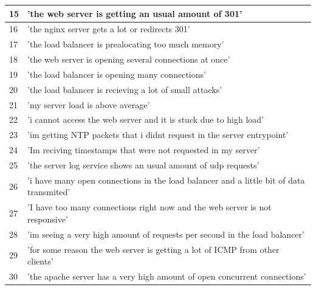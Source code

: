 \begin{table}
{\begin{tabular}{|l|l|}
\hline
15     & 'the web server is getting an usual amount of 301'                                                        \\ 
\hline
16     & 'the nginx server gets a lot or redirects 301'                                                            \\ 
\hline
17     & 'the load balancer is prealocating too much memory'                                                       \\ 
\hline
18     & 'the web server is opening several connections at once'                                                   \\ 
\hline
19     & 'the load balancer is opening many connections'                                                           \\ 
\hline
20     & 'the load balancer is recieving a lot of small attacks'                                                   \\ 
\hline
21     & 'my server load is above average'                                                                         \\ 
\hline
22     & 'i cannot access the web server and it is stuck due to high load'                                         \\ 
\hline
23     & 'im getting NTP packets that i didnt request in the server entrypoint'                                    \\ 
\hline
24     & 'Im reciving timestamps that were not requested in my server'                                             \\ 
\hline
25     & 'the server log service shows an usual amount of udp requests'                                            \\ 
\hline
26     & 'i have many open connections in the load balancer and a little bit of data transmited'                   \\ 
\hline
27     & 'I have too many connections right now and the web server is not responsive'                              \\ 
\hline
28     & 'im seeing a very high amount of requests per second in the load balancer'                                \\ 
\hline
29     & 'for some reason the web server is getting a lot of ICMP from other clients'                              \\ 
\hline
30     & 'the apache server has a very high amount of open concurrent connections'                                 \\ 

\end{tabular}}
\end{table}
